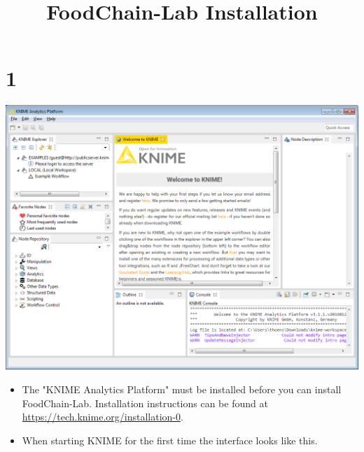 \documentclass{beamer}
\title{FoodChain-Lab Installation}
\date{}
\begin{document}
\maketitle
 
\section{1}
\begin{frame}
	\begin{center}
  		\includegraphics[height=0.6\textheight]{1.png}
	\end{center}
	\begin{itemize}
		\item The "KNIME Analytics Platform" must be installed before you can install FoodChain-Lab. Installation instructions can be found at \url{https://tech.knime.org/installation-0}.
		\item When starting KNIME for the first time the interface looks like this.
	\end{itemize}
\end{frame}
\end{document}
